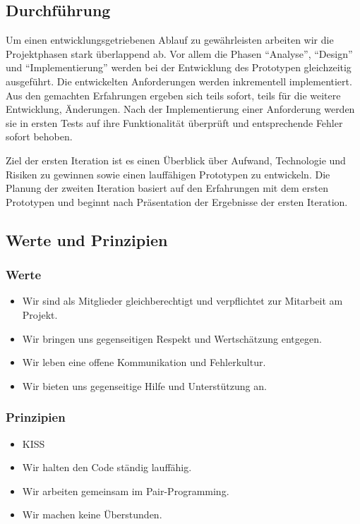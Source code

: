 \vspace{1,5cm}

\subsection{Durchführung}
\noindent Um einen entwicklungsgetriebenen Ablauf zu gewährleisten arbeiten wir die Projektphasen stark überlappend ab. Vor allem die Phasen "`Analyse"', "`Design"' und "`Implementierung"' werden bei der Entwicklung des Prototypen gleichzeitig ausgeführt. Die entwickelten Anforderungen werden inkrementell implementiert. Aus den gemachten Erfahrungen ergeben sich teils sofort, teils für die weitere Entwicklung, Änderungen. Nach der Implementierung einer Anforderung werden sie in ersten Tests auf ihre Funktionalität überprüft und entsprechende Fehler sofort behoben.

\noindent Ziel der ersten Iteration ist es einen Überblick über Aufwand, Technologie und Risiken zu gewinnen sowie einen lauffähigen Prototypen zu entwickeln. Die Planung der zweiten Iteration basiert auf den Erfahrungen mit dem ersten Prototypen und beginnt nach Präsentation der Ergebnisse der ersten Iteration.

\newpage

\subsection{Werte und Prinzipien}
\vspace{1cm}
\subsubsection*{Werte}

\begin{itemize}
    \item Wir sind als Mitglieder gleichberechtigt und verpflichtet zur Mitarbeit am Projekt.
    \item Wir bringen uns gegenseitigen Respekt und Wertschätzung entgegen.
    \item Wir leben eine offene Kommunikation und Fehlerkultur.
    \item Wir bieten uns gegenseitige Hilfe und Unterstützung an.
\end{itemize}{}

\subsubsection*{Prinzipien}
\begin{itemize}
    \item KISS
    \item Wir halten den Code ständig lauffähig.
    \item Wir arbeiten gemeinsam im Pair-Programming.
    \item Wir machen keine Überstunden.
\end{itemize}{}
